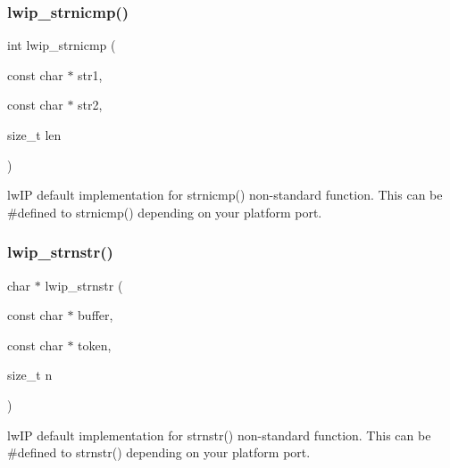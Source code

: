 \subsubsection{\texorpdfstring{lwip\+\_\+strnicmp()}{lwip\_strnicmp()}}
{\footnotesize\ttfamily int lwip\+\_\+strnicmp (\begin{DoxyParamCaption}\item[{const char $\ast$}]{str1,  }\item[{const char $\ast$}]{str2,  }\item[{size\+\_\+t}]{len }\end{DoxyParamCaption})}

lw\+IP default implementation for strnicmp() non-\/standard function. This can be \#defined to strnicmp() depending on your platform port. \mbox{\label{group__sys__nonstandard_gaa2ba4b4e2dd7e1c856fedc6a6069813e}} 
\subsubsection{\texorpdfstring{lwip\+\_\+strnstr()}{lwip\_strnstr()}}
{\footnotesize\ttfamily char $\ast$ lwip\+\_\+strnstr (\begin{DoxyParamCaption}\item[{const char $\ast$}]{buffer,  }\item[{const char $\ast$}]{token,  }\item[{size\+\_\+t}]{n }\end{DoxyParamCaption})}

lw\+IP default implementation for strnstr() non-\/standard function. This can be \#defined to strnstr() depending on your platform port. 